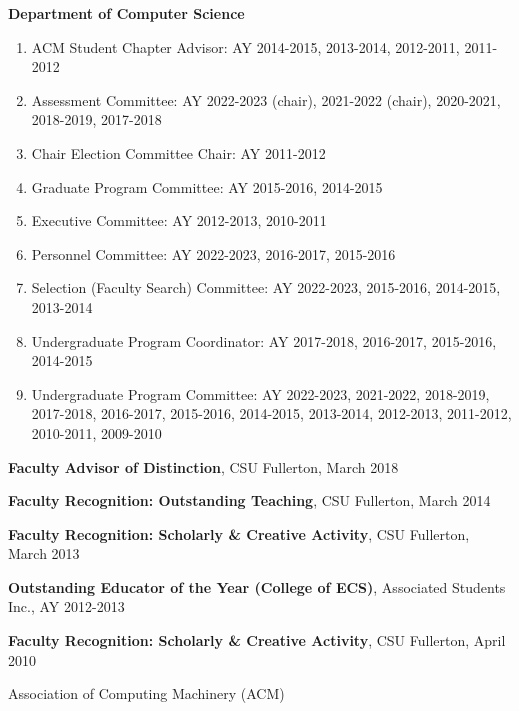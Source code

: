 \documentclass[11pt]{letter}
\begin{document}
\textbf{Department of Computer Science}
\begin{enumerate}
\item ACM Student Chapter Advisor: AY 2014-2015, 2013-2014, 2012-2011, 2011-2012
\item Assessment Committee: AY 2022-2023 (chair), 2021-2022 (chair), 2020-2021, 2018-2019, 2017-2018
\item Chair Election Committee Chair: AY 2011-2012
\item Graduate Program Committee: AY 2015-2016, 2014-2015
\item Executive Committee: AY 2012-2013, 2010-2011
\item Personnel Committee: AY 2022-2023, 2016-2017, 2015-2016
\item Selection (Faculty Search) Committee: AY 2022-2023, 2015-2016, 2014-2015, 2013-2014
\item Undergraduate Program Coordinator: AY 2017-2018, 2016-2017, 2015-2016, 2014-2015
\item Undergraduate Program Committee: AY 2022-2023, 2021-2022, 2018-2019, 2017-2018, 2016-2017, 2015-2016, 2014-2015, 2013-2014, 2012-2013, 2011-2012, 2010-2011, 2009-2010
\end{enumerate}


\textbf{Faculty Advisor of Distinction}, CSU Fullerton, March 2018

\textbf{Faculty Recognition: Outstanding Teaching}, CSU Fullerton, March 2014

\textbf{Faculty Recognition: Scholarly \& Creative Activity}, CSU Fullerton, March 2013

\textbf{Outstanding Educator of the Year (College of ECS)}, Associated Students Inc., AY 2012-2013

\textbf{Faculty Recognition: Scholarly \& Creative Activity}, CSU Fullerton, April 2010


Association of Computing Machinery (ACM) \\
\end{document}
